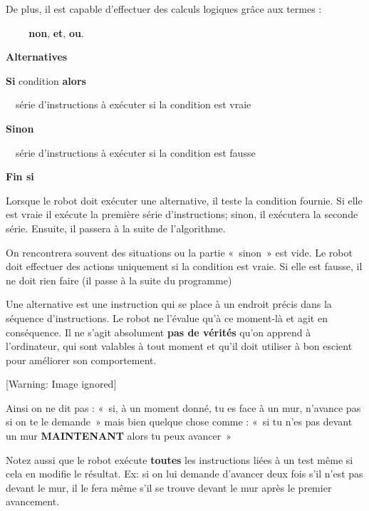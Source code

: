 {\sffamily
De plus, il est capable d'effectuer des calculs
logiques grâce aux termes :}

{\sffamily
\textbf{\ \ \ \ non}, \textbf{et}, \textbf{ou}.}

{\bfseries
Alternatives}

{\sffamily
\textbf{Si} condition \textbf{alors}}

{\sffamily
\ \ série d'instructions à exécuter si la condition est
vraie}

{\sffamily\bfseries
Sinon}

{\sffamily
\ \ série d'instructions à exécuter si la condition est
fausse}

{\sffamily\bfseries
Fin si}


\bigskip

{
Lorsque le robot doit exécuter une alternative, il teste la condition
fournie. Si elle est vraie il exécute la première série
d'instructions; sinon, il exécutera la seconde série.
Ensuite, il passera à la suite de l'algorithme.}


\bigskip

{
On rencontrera souvent des situations ou la partie «~sinon~» est vide.
Le robot doit effectuer des actions uniquement si la condition est
vraie. Si elle est fausse, il ne doit rien faire (il passe à la suite
du programme)}

{
Une alternative est une instruction qui se place à un endroit précis
dans la séquence d'instructions. Le robot ne
l'évalue qu'à ce moment-là et agit en
conséquence. Il ne s'agit absolument \textbf{pas de
vérités} qu'on apprend à
l'ordinateur, qui sont valables à tout moment et
qu'il doit utiliser à bon escient pour améliorer son
comportement.}

\begin{center}
 [Warning: Image ignored] %

\end{center}
{
Ainsi on ne dit pas : «~si, à un moment donné, tu es face à un mur,
n'avance pas si on te le demande~» mais bien quelque
chose comme : «~si tu n'es pas devant un mur
\textbf{MAINTENANT} alors tu peux avancer~»}

{
Notez aussi que le robot exécute \textbf{toutes} les instructions liées
à un test même si cela en modifie le résultat. Ex: si on lui demande
d'avancer deux fois s'il
n'est pas devant le mur, il le fera même
s'il se trouve devant le mur après le premier
avancement.}

